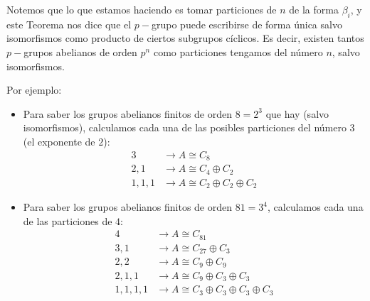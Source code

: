 \begin{observacion}
    Notemos que lo que estamos haciendo es tomar particiones de $n$ de la forma $\beta_i$, y este Teorema nos dice que el $p-$grupo puede escribirse de forma única salvo isomorfismos como producto de ciertos subgrupos cíclicos.\newline
    Es decir, existen tantos $p-$grupos abelianos de orden $p^n$ como particiones tengamos del número $n$, salvo isomorfismos.
\end{observacion}

\begin{ejemplo}
    Por ejemplo:
    \begin{itemize}
        \item Para saber los grupos abelianos finitos de orden $8 = 2^3$ que hay (salvo isomorfismos), calculamos cada una de las posibles particiones del número 3 (el exponente de $2$):
            \begin{align*}
                3& \longrightarrow A\cong C_8 \\
                2, 1& \longrightarrow A\cong C_4\oplus C_2 \\
                1, 1, 1& \longrightarrow A\cong C_2 \oplus C_2 \oplus C_2
            \end{align*}
        \item Para saber los grupos abelianos finitos de orden $81 = 3^4$, calculamos cada una de las particiones de $4$:
            \begin{align*}
                4 &\longrightarrow A\cong C_{81} \\
                3, 1 &\longrightarrow A\cong C_{27} \oplus C_3 \\
                2, 2 &\longrightarrow A \cong C_{9} \oplus C_9 \\
                2, 1, 1 &\longrightarrow A \cong C_9 \oplus C_3 \oplus C_3 \\
                1, 1, 1, 1 &\longrightarrow A \cong C_3 \oplus C_3 \oplus C_3 \oplus C_3 
            \end{align*}
    \end{itemize}
\end{ejemplo}

